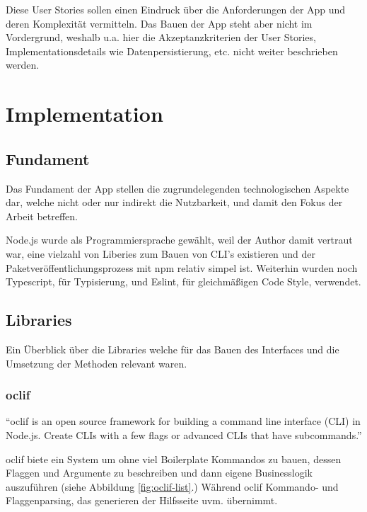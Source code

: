 \documentclass[oneside,bibliography=totocnumbered,BCOR=5mm]{scrbook}
\begin{document}
Diese User Stories sollen einen Eindruck über die Anforderungen der App
und deren Komplexität vermitteln. Das Bauen der App steht aber nicht im
Vordergrund, weshalb u.a. hier die Akzeptanzkriterien der User Stories,
Implementationsdetails wie Datenpersistierung, etc. nicht weiter beschrieben
werden.

\chapter{Implementation}
\section{Fundament}

Das Fundament der App stellen die zugrundelegenden technologischen Aspekte dar,
welche nicht oder nur indirekt die Nutzbarkeit, und damit den Fokus der Arbeit
betreffen.

Node.js wurde als Programmiersprache gewählt, weil der Author damit vertraut
war, eine vielzahl von Liberies zum Bauen von CLI's existieren und der
Paketveröffentlichungsprozess mit npm relativ simpel ist.
Weiterhin wurden noch Typescript, für Typisierung, und Eslint, für gleichmäßigen
Code Style, verwendet.

\section{Libraries}

Ein Überblick über die Libraries welche für das Bauen des Interfaces und die
Umsetzung der Methoden relevant waren.

\subsection{oclif}

``oclif is an open source framework for building a command line interface
(CLI) in Node.js. Create CLIs with a few flags or advanced CLIs that have
subcommands.'' \parencite{oclif}

oclif biete ein System um ohne viel Boilerplate Kommandos zu bauen, dessen
Flaggen und Argumente zu beschreiben und dann eigene Businesslogik auszuführen
(siehe Abbildung \ref{fig:oclif-list}.) Während oclif Kommando- und
Flaggenparsing, das generieren der Hilfsseite uvm. übernimmt.
\end{document}
